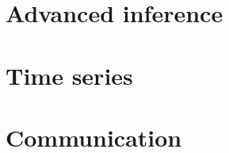 \documentclass[oneside]{book}
\begin{document}
\part{Advanced inference}







\part{Time series}










\part{Communication}




\end{document}
